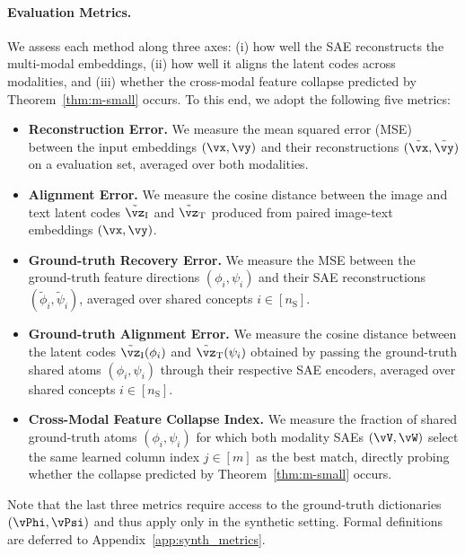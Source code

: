 \paragraph{Evaluation Metrics.}
We assess each method along three axes: (i) how well the SAE reconstructs the multi-modal embeddings, (ii) how well it aligns the latent codes across modalities, and (iii) whether the cross-modal feature collapse predicted by Theorem~\ref{thm:m-small} occurs. To this end, we adopt the following five metrics:
\begin{itemize}
    \item \textbf{Reconstruction Error.} We measure the mean squared error (MSE) between the input embeddings $(\vx, \vy)$ and their reconstructions $(\tilde{\vx}, \tilde{\vy})$ on a evaluation set, averaged over both modalities.
    \item \textbf{Alignment Error.} We measure the cosine distance between the image and text latent codes $\tilde{\vz}_{\mathrm I}$ and $\tilde{\vz}_{\mathrm T}$ produced from paired image-text embeddings $(\vx, \vy)$.
    \item \textbf{Ground-truth Recovery Error.} We measure the MSE between the ground-truth feature directions $(\phi_i, \psi_i)$ and their SAE reconstructions $(\tilde{\phi}_i, \tilde{\psi}_i)$, averaged over shared concepts $i \in [n_{\mathrm S}]$.
    \item \textbf{Ground-truth Alignment Error.} We measure the cosine distance between the latent codes $\tilde{\vz}_{\mathrm I}(\phi_i)$ and $\tilde{\vz}_{\mathrm T}(\psi_i)$ obtained by passing the ground-truth shared atoms $(\phi_i, \psi_i)$ through their respective SAE encoders, averaged over shared concepts $i \in [n_{\mathrm S}]$.
    \item \textbf{Cross-Modal Feature Collapse Index.} We measure the fraction of shared ground-truth atoms $(\phi_i, \psi_i)$ for which both modality SAEs $(\vV, \vW)$ select the same learned column index $j \in [m]$ as the best match, directly probing whether the collapse predicted by Theorem~\ref{thm:m-small} occurs.
\end{itemize}
Note that the last three metrics require access to the ground-truth dictionaries $(\vPhi, \vPsi)$ and thus apply only in the synthetic setting. Formal definitions are deferred to Appendix~\ref{app:synth_metrics}.
